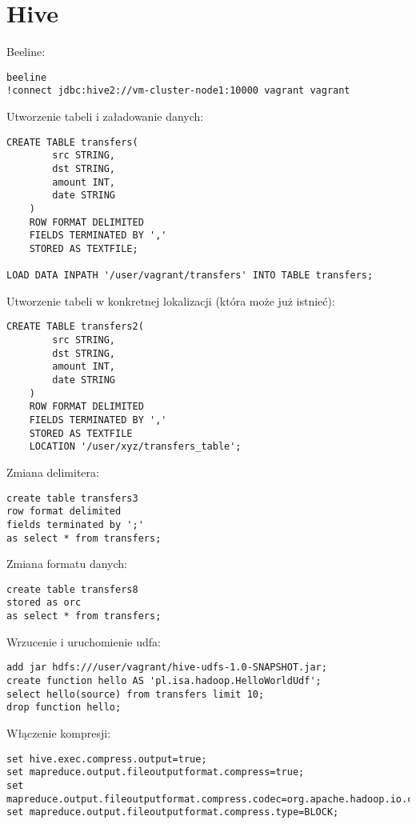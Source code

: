 \documentclass{article}
\begin{document}
\section*{Hive}

Beeline:
\begin{lstlisting}
beeline
!connect jdbc:hive2://vm-cluster-node1:10000 vagrant vagrant
\end{lstlisting}

Utworzenie tabeli i załadowanie danych:
\begin{lstlisting}
CREATE TABLE transfers(
		src STRING,
		dst STRING,
		amount INT,
		date STRING
	)
	ROW FORMAT DELIMITED
	FIELDS TERMINATED BY ','
	STORED AS TEXTFILE;

LOAD DATA INPATH '/user/vagrant/transfers' INTO TABLE transfers;
\end{lstlisting}

Utworzenie tabeli w konkretnej lokalizacji (która może już istnieć):
\begin{lstlisting}
CREATE TABLE transfers2(
		src STRING,
		dst STRING,
		amount INT,
		date STRING
	)
	ROW FORMAT DELIMITED
	FIELDS TERMINATED BY ','
	STORED AS TEXTFILE
	LOCATION '/user/xyz/transfers_table';
\end{lstlisting}

Zmiana delimitera:
\begin{lstlisting}
create table transfers3
row format delimited
fields terminated by ';'
as select * from transfers;
\end{lstlisting}

Zmiana formatu danych:
\begin{lstlisting}
create table transfers8
stored as orc
as select * from transfers;
\end{lstlisting}

Wrzucenie i uruchomienie udfa:
\begin{lstlisting}
add jar hdfs:///user/vagrant/hive-udfs-1.0-SNAPSHOT.jar;
create function hello AS 'pl.isa.hadoop.HelloWorldUdf';
select hello(source) from transfers limit 10;
drop function hello;
\end{lstlisting}

Włączenie kompresji:
\begin{lstlisting}
set hive.exec.compress.output=true;
set mapreduce.output.fileoutputformat.compress=true;
set mapreduce.output.fileoutputformat.compress.codec=org.apache.hadoop.io.compress.GzipCodec;
set mapreduce.output.fileoutputformat.compress.type=BLOCK;
\end{lstlisting}
\end{document}
